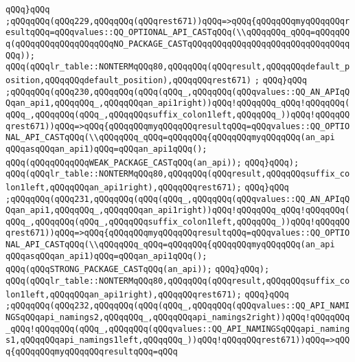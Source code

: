 \verb|qQQq}qQQq|\newline
\verb|;qQQqqQQq(qQQq229,qQQqqQQq(qQQqrest671))qQQq=>qQQq{qQQqqQQqmyqQQqqQQqresultqQQq=qQQqvalues::QQ_OPTIONAL_API_CASTqQQq(\\qQQqqQQq_qQQq=qQQqqQQq(qQQqqQQqqQQqqQQqqQQqNO_PACKAGE_CASTqQQqqQQqqQQqqQQqqQQqqQQqqQQqqQQqqQQq));|\newline
\verb|qQQq(qQQqlr_table::NONTERMqQQq80,qQQqqQQq(qQQqresult,qQQqqQQqdefault_position,qQQqqQQqdefault_position),qQQqqQQqrest671)|\newline
\verb|;|\newline
\verb|qQQq}qQQq|\newline
\verb|;qQQqqQQq(qQQq230,qQQqqQQq(qQQq(qQQq_,qQQqqQQq(qQQqvalues::QQ_AN_APIqQQqan_api1,qQQqqQQq_,qQQqqQQqan_api1right))qQQq!qQQqqQQq_qQQq!qQQqqQQq(qQQq_,qQQqqQQq(qQQq_,qQQqqQQqsuffix_colon1left,qQQqqQQq_))qQQq!qQQqqQQqrest671))qQQq=>qQQq{qQQqqQQqmyqQQqqQQqresultqQQq=qQQqvalues::QQ_OPTIONAL_API_CASTqQQq(\\qQQqqQQq_qQQq=qQQqqQQq{qQQqqQQqmyqQQqqQQq(an_api|\newline
\verb|qQQqasqQQqan_api1)qQQq=qQQqan_api1qQQq();|\newline
\verb|qQQq(qQQqqQQqqQQqWEAK_PACKAGE_CASTqQQq(an_api));|\newline
\verb|qQQq}qQQq);|\newline
\verb|qQQq(qQQqlr_table::NONTERMqQQq80,qQQqqQQq(qQQqresult,qQQqqQQqsuffix_colon1left,qQQqqQQqan_api1right),qQQqqQQqrest671);|\newline
\verb|qQQq}qQQq|\newline
\verb|;qQQqqQQq(qQQq231,qQQqqQQq(qQQq(qQQq_,qQQqqQQq(qQQqvalues::QQ_AN_APIqQQqan_api1,qQQqqQQq_,qQQqqQQqan_api1right))qQQq!qQQqqQQq_qQQq!qQQqqQQq(qQQq_,qQQqqQQq(qQQq_,qQQqqQQqsuffix_colon1left,qQQqqQQq_))qQQq!qQQqqQQqrest671))qQQq=>qQQq{qQQqqQQqmyqQQqqQQqresultqQQq=qQQqvalues::QQ_OPTIONAL_API_CASTqQQq(\\qQQqqQQq_qQQq=qQQqqQQq{qQQqqQQqmyqQQqqQQq(an_api|\newline
\verb|qQQqasqQQqan_api1)qQQq=qQQqan_api1qQQq();|\newline
\verb|qQQq(qQQqSTRONG_PACKAGE_CASTqQQq(an_api));|\newline
\verb|qQQq}qQQq);|\newline
\verb|qQQq(qQQqlr_table::NONTERMqQQq80,qQQqqQQq(qQQqresult,qQQqqQQqsuffix_colon1left,qQQqqQQqan_api1right),qQQqqQQqrest671);|\newline
\verb|qQQq}qQQq|\newline
\verb|;qQQqqQQq(qQQq232,qQQqqQQq(qQQq(qQQq_,qQQqqQQq(qQQqvalues::QQ_API_NAMINGSqQQqapi_namings2,qQQqqQQq_,qQQqqQQqapi_namings2right))qQQq!qQQqqQQq_qQQq!qQQqqQQq(qQQq_,qQQqqQQq(qQQqvalues::QQ_API_NAMINGSqQQqapi_namings1,qQQqqQQqapi_namings1left,qQQqqQQq_))qQQq!qQQqqQQqrest671))qQQq=>qQQq{qQQqqQQqmyqQQqqQQqresultqQQq=qQQq|\newline
